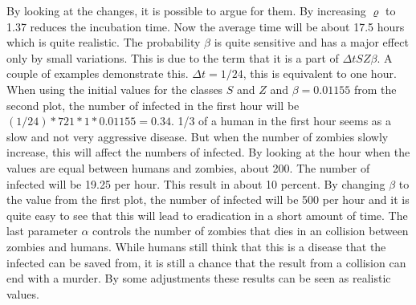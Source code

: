 \documentclass[%
twoside,                 %
final,                   %
10pt]{article}
\begin{document}
By looking at the changes, it is possible to argue for them. By increasing $\varrho$ to 1.37 reduces the incubation time. Now the average time will be about 17.5 hours which is quite realistic. The probability $\beta$ is quite sensitive and has a major effect only by small variations. This is due to the term that it is a part of $\Delta t SZ \beta$. A couple of examples demonstrate this. $\Delta t = 1/24$, this is equivalent to one hour. When using the initial values for the classes $S$ and $Z$ and $\beta=0.01155$ from the second plot, the number of infected in the first hour will be $(1/24)*721*1*0.01155=0.34$. 1/3 of a human in the first hour seems as a slow and not very aggressive disease. But when the number of zombies slowly increase, this will affect the numbers of infected. By looking at the hour when the values are equal between humans and zombies, about 200. The number of infected will be 19.25 per hour. This result in about 10 percent. By changing $\beta$ to the value from the first plot, the number of infected will be 500 per hour and it is quite easy to see that this will lead to eradication in a short amount of time. The last parameter $\alpha$ controls the number of zombies that dies in an collision between zombies and humans. While humans still think that this is a disease that the infected can be saved from, it is still a chance that the result from a collision can end with a murder. By some adjustments these results can be seen as realistic values.
\end{document}
